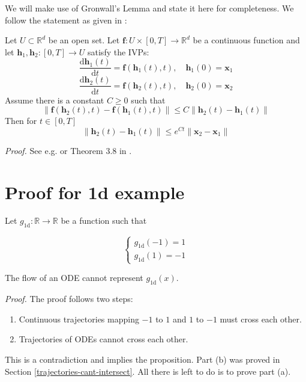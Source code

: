 \documentclass{article}
\begin{document}
We will make use of Gronwall's Lemma and state it here for completeness. We follow the statement as given in \cite{howard1998gronwall}:

\begin{theorem*} Let $U \subset \mathbb{R}^d$ be an open set. Let $\mathbf{f} :  U \times [0, T] \to \mathbb{R}^d$ be a continuous function and let $\mathbf{h}_1, \mathbf{h}_2 : [0, T] \to U$ satisfy the IVPs:
$$ \frac{\mathrm{d}\mathbf{h}_1(t)}{\mathrm{d}t} = \mathbf{f}(\mathbf{h}_1(t), t), \quad \mathbf{h}_1(0) = \mathbf{x}_1$$
$$ \frac{\mathrm{d}\mathbf{h}_2(t)}{\mathrm{d}t} = \mathbf{f}(\mathbf{h}_2(t), t), \quad \mathbf{h}_2(0) = \mathbf{x}_2$$
Assume there is a constant $C \geq 0$ such that
$$\|\mathbf{f}(\mathbf{h}_2(t), t) - \mathbf{f}(\mathbf{h}_1(t), t)\| \leq C \|\mathbf{h}_2(t) - \mathbf{h}_1(t)\|$$
Then for $t \in [0, T]$
$$\|\mathbf{h}_2(t) - \mathbf{h}_1(t)\| \leq e^{Ct}\|\mathbf{x}_2 - \mathbf{x}_1\|$$
\end{theorem*}

\textit{Proof.} See e.g. \cite{howard1998gronwall} or Theorem 3.8 in \cite{younes2010shapes}.

\section{Proof for 1d example} \label{proof-1d}

Let $g_{1\text{d}} : \mathbb{R} \to \mathbb{R}$ be a function such that

\[
  \begin{cases}
       g_{1\text{d}}(-1) = 1 \\
       g_{1\text{d}}(1) = -1
  \end{cases}
\]

\begin{customprop}{1} The flow of an ODE cannot represent $g_{1\text{d}}(x)$.
\end{customprop}

\textit{Proof.} The proof follows two steps: 
    \begin{enumerate}[label=(\alph*)]
        \item Continuous trajectories mapping $-1$ to $1$ and $1$ to $-1$ must cross each other. 
        \item Trajectories of ODEs cannot cross each other.
    \end{enumerate}
This is a contradiction and implies the proposition. Part (b) was proved in Section \ref{trajectories-cant-intersect}. All there is left to do is to prove part (a).
\end{document}
